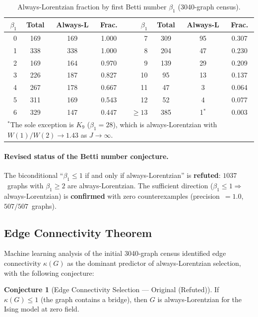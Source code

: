 \documentclass[11pt]{article}
\theoremstyle{definition}
\newtheorem{conjecture}[theorem]{Conjecture}
\theoremstyle{remark}
\begin{document}
\begin{table}[htbp]
\centering
\caption{Always-Lorentzian fraction by first Betti number $\beta_1$ (3040-graph census).}
\label{tab:beta1-phase}
\begin{tabular}{@{}rcccrccc@{}}
\toprule
$\beta_1$ & Total & Always-L & Frac. & $\beta_1$ & Total & Always-L & Frac. \\
\midrule
0 & 169 & 169 & 1.000 & 7 & 309 & 95 & 0.307 \\
1 & 338 & 338 & 1.000 & 8 & 204 & 47 & 0.230 \\
2 & 169 & 164 & 0.970 & 9 & 139 & 29 & 0.209 \\
3 & 226 & 187 & 0.827 & 10 & 95 & 13 & 0.137 \\
4 & 267 & 178 & 0.667 & 11 & 47 & 3 & 0.064 \\
5 & 311 & 169 & 0.543 & 12 & 52 & 4 & 0.077 \\
6 & 329 & 147 & 0.447 & $\geq 13$ & 385 & 1$^*$ & 0.003 \\
\bottomrule
\multicolumn{8}{l}{\footnotesize $^*$The sole exception is $K_9$ ($\beta_1 = 28$),
which is always-Lorentzian with $W(1)/W(2) \to 1.43$ as $J \to \infty$.}
\end{tabular}
\end{table}

\paragraph{Revised status of the Betti number conjecture.}
The biconditional ``$\beta_1 \leq 1$ if and only if always-Lorentzian'' is
\textbf{refuted}: $1037$~graphs with $\beta_1 \geq 2$ are always-Lorentzian.
The sufficient direction ($\beta_1 \leq 1 \Rightarrow$ always-Lorentzian) is
\textbf{confirmed} with zero counterexamples (precision~$= 1.0$, $507/507$~graphs).

\subsection{Edge Connectivity Theorem}
\label{sec:edge-connectivity}

Machine learning analysis of the initial 3040-graph census identified edge
connectivity $\kappa(G)$ as the dominant predictor of always-Lorentzian
selection, with the following conjecture:

\begin{conjecture}[Edge Connectivity Selection --- Original (Refuted)]
\label{conj:edge-conn}
If $\kappa(G) \leq 1$ (the graph contains a bridge), then $G$ is
always-Lorentzian for the Ising model at zero field.
\end{conjecture}
\end{document}

